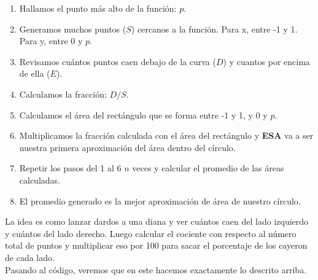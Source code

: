 \documentclass[10pt,letterpaper]{article}
\begin{document}
\begin{enumerate}
\item Hallamos el punto m\'as alto de la funci\'on: $p$.
\item Generamos muchos puntos ($S$) cercanos a la funci\'on. Para x, entre -1 y 1. Para y, entre 0 y $p$.
\item Revisamos cu\'antos puntos caen debajo de la curva ($D$) y cuantos por encima de ella ($E$).
\item Calculamos la fracci\'on: $D/S$.
\item Calculamos el \'area del rect\'angulo que se forma entre -1 y 1, y 0 y $p$.
\item Multiplicamos la fracci\'on calculada con el \'area del rect\'angulo y \textbf{ESA} va a ser nuestra primera aproximaci\'on del \'area dentro del c\'irculo.
\item Repetir los pasos del 1 al 6 $n$ veces y calcular el promedio de las \'areas calculadas.
\item El promedio generado es la mejor aproximaci\'on de \'area de nuestro c\'irculo.
\end{enumerate}

La idea es como lanzar dardos a una diana y ver cu\'antos caen del lado izquierdo y cu\'antos del lado derecho. Luego calcular el cociente con respecto al n\'umero total de puntos y multiplicar eso por 100 para sacar el porcentaje de los cayeron de cada lado.\\

Pasando al c\'odigo, veremos que en este hacemos exactamente lo descrito arriba.
\end{document}
